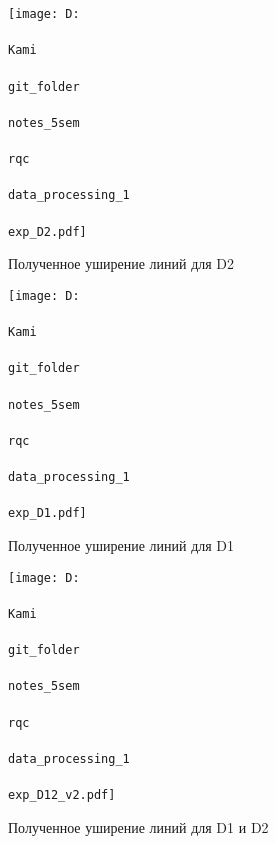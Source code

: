 


\begin{figure}[h]
    \centering
    \texttt{[image: D:\\\\Kami\\\\git\_folder\\\\notes\_5sem\\\\rqc\\\\data\_processing\_1\\\\exp\_D2.pdf]}
    \caption{Полученное уширение линий для D2}
    \label{fig:expD2}
\end{figure}


\begin{figure}[h]
    \centering
    \texttt{[image: D:\\\\Kami\\\\git\_folder\\\\notes\_5sem\\\\rqc\\\\data\_processing\_1\\\\exp\_D1.pdf]}
    \caption{Полученное уширение линий для D1}
    \label{fig:expD1}
\end{figure}


\begin{figure}[h!]
    \centering
    \texttt{[image: D:\\\\Kami\\\\git\_folder\\\\notes\_5sem\\\\rqc\\\\data\_processing\_1\\\\exp\_D12\_v2.pdf]}
    \caption{Полученное уширение линий для D1 и D2}
    \label{fig:expD12}
\end{figure}


